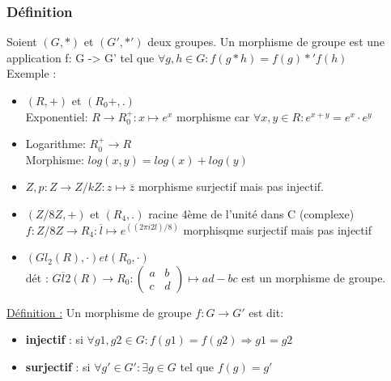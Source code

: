 \documentclass[11pt]{article}
\begin{document}
			\subsubsection{Définition}
				Soient $(G, *)$ et $(G', *')$ deux groupes. Un morphisme de groupe est une application f: G -> G' tel que $\forall g, h \in G: f(g*h) = f(g) *' f(h)$\\
				Exemple : 
				\begin{itemize}
					\item $(R, +)$ et $(R_0 +, .)$\\
					Exponentiel: $R \rightarrow R_0^+ : x \mapsto e^x$ morphisme car $\forall x, y \in R : e^{x+y} = e^x \cdot e^y$
					 \item Logarithme: $R_0^+ \rightarrow R$\\
					Morphisme: $log(x, y) = log(x) + log(y)$
				 	\item $Z, p: Z \rightarrow Z/kZ : z \mapsto \overline{z}$ morphisme surjectif mais pas injectif.
					 \item $(Z/8Z, +)$ et $(R_4, .)$ racine 4ème de l'unité dans C (complexe)\\
					$f: Z/8Z \rightarrow R_4 : \overline{l} \mapsto e^((2\pi i 2l )/8)$ morphisqme surjectif mais pas injectif
					 \item $(Gl_2(R), \cdot ) et (R_0, \cdot )$ \\
					dét : $G\overline{l}2(R) \rightarrow R_0 : 
						\begin{pmatrix}
  							a & b \\
							c & d 
						\end{pmatrix}
						\mapsto ad - bc$ est un morphisme de groupe.
				\end{itemize}
	
			\underline{Définition :} Un morphisme de groupe $f: G \rightarrow G'$ est dit:
			\begin{itemize}
				\item \textbf{injectif} : si $\forall g1, g2 \in G: f(g1) = f(g2) \Rightarrow g1 = g2$
				\item \textbf{surjectif} : si $\forall g' \in G': \exists g \in G$ tel que $f(g) = g'$\\
			\end{itemize}
			
\end{document}
